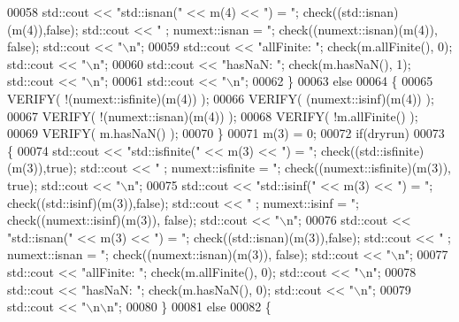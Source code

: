 \begin{DoxyCode}
00058     std::cout << \textcolor{stringliteral}{"std::isnan("} << m(4) << \textcolor{stringliteral}{")    = "}; check((std::isnan)(m(4)),\textcolor{keyword}{false});    std::cout << \textcolor{stringliteral}{"  ;
       numext::isnan    = "}; check((numext::isnan)(m(4)), \textcolor{keyword}{false}); std::cout << \textcolor{stringliteral}{"\(\backslash\)n"};
00059     std::cout << \textcolor{stringliteral}{"allFinite: "}; check(m.allFinite(), 0); std::cout << \textcolor{stringliteral}{"\(\backslash\)n"};
00060     std::cout << \textcolor{stringliteral}{"hasNaN:    "}; check(m.hasNaN(), 1);    std::cout << \textcolor{stringliteral}{"\(\backslash\)n"};
00061     std::cout << \textcolor{stringliteral}{"\(\backslash\)n"};
00062   \}
00063   \textcolor{keywordflow}{else}
00064   \{
00065     VERIFY( !(numext::isfinite)(m(4)) );
00066     VERIFY(  (numext::isinf)(m(4)) );
00067     VERIFY( !(numext::isnan)(m(4)) );
00068     VERIFY( !m.allFinite() );
00069     VERIFY(  m.hasNaN() );
00070   \}
00071   m(3) = 0;
00072   \textcolor{keywordflow}{if}(dryrun)
00073   \{
00074     std::cout << \textcolor{stringliteral}{"std::isfinite("} << m(3) << \textcolor{stringliteral}{") = "}; check((std::isfinite)(m(3)),\textcolor{keyword}{true}); std::cout << \textcolor{stringliteral}{"  ;
       numext::isfinite = "}; check((numext::isfinite)(m(3)), \textcolor{keyword}{true}); std::cout << \textcolor{stringliteral}{"\(\backslash\)n"};
00075     std::cout << \textcolor{stringliteral}{"std::isinf("} << m(3) << \textcolor{stringliteral}{")    = "}; check((std::isinf)(m(3)),\textcolor{keyword}{false});    std::cout << \textcolor{stringliteral}{"  ;
       numext::isinf    = "}; check((numext::isinf)(m(3)), \textcolor{keyword}{false}); std::cout << \textcolor{stringliteral}{"\(\backslash\)n"};
00076     std::cout << \textcolor{stringliteral}{"std::isnan("} << m(3) << \textcolor{stringliteral}{")    = "}; check((std::isnan)(m(3)),\textcolor{keyword}{false});     std::cout << \textcolor{stringliteral}{"  ;
       numext::isnan    = "}; check((numext::isnan)(m(3)), \textcolor{keyword}{false}); std::cout << \textcolor{stringliteral}{"\(\backslash\)n"};
00077     std::cout << \textcolor{stringliteral}{"allFinite: "}; check(m.allFinite(), 0); std::cout << \textcolor{stringliteral}{"\(\backslash\)n"};
00078     std::cout << \textcolor{stringliteral}{"hasNaN:    "}; check(m.hasNaN(), 0);    std::cout << \textcolor{stringliteral}{"\(\backslash\)n"};
00079     std::cout << \textcolor{stringliteral}{"\(\backslash\)n\(\backslash\)n"};
00080   \}
00081   \textcolor{keywordflow}{else}
00082   \{

\end{DoxyCode}
